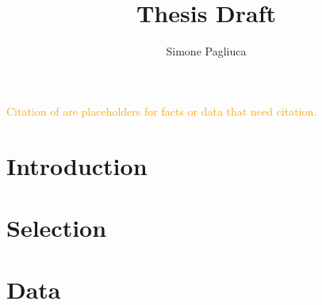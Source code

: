 \documentclass{article}
\title{Thesis Draft}
\author{Simone Pagliuca}
\begin{document}
\raggedright
\doublespacing

\textcolor{orange}{Citation of \cite{PLACEHOLDER} are placeholders for facts or data that need citation.}
\section*{Introduction}
\label{sec:introduction}




\section{Selection}
\label{sec:selection}



\section{Data}
\label{sec:data}


\nocite{*}

\end{document}
